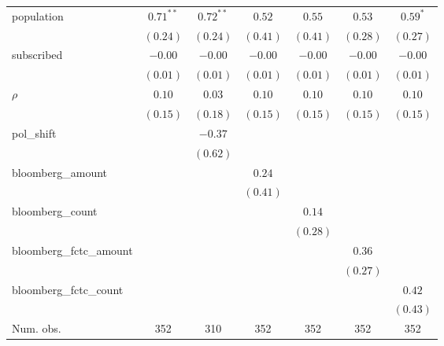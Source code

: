 \begin{table}[!h]
\begin{center}
\begin{tabular}{l c c c c c c }
population              & $0.71^{**}$  & $0.72^{**}$  & $0.52$       & $0.55$       & $0.53$       & $0.59^{*}$   \\
                        & $(0.24)$     & $(0.24)$     & $(0.41)$     & $(0.41)$     & $(0.28)$     & $(0.27)$     \\
subscribed              & $-0.00$      & $-0.00$      & $-0.00$      & $-0.00$      & $-0.00$      & $-0.00$      \\
                        & $(0.01)$     & $(0.01)$     & $(0.01)$     & $(0.01)$     & $(0.01)$     & $(0.01)$     \\
$\rho$                  & $0.10$       & $0.03$       & $0.10$       & $0.10$       & $0.10$       & $0.10$       \\
                        & $(0.15)$     & $(0.18)$     & $(0.15)$     & $(0.15)$     & $(0.15)$     & $(0.15)$     \\
pol\_shift              &              & $-0.37$      &              &              &              &              \\
                        &              & $(0.62)$     &              &              &              &              \\
bloomberg\_amount       &              &              & $0.24$       &              &              &              \\
                        &              &              & $(0.41)$     &              &              &              \\
bloomberg\_count        &              &              &              & $0.14$       &              &              \\
                        &              &              &              & $(0.28)$     &              &              \\
bloomberg\_fctc\_amount &              &              &              &              & $0.36$       &              \\
                        &              &              &              &              & $(0.27)$     &              \\
bloomberg\_fctc\_count  &              &              &              &              &              & $0.42$       \\
                        &              &              &              &              &              & $(0.43)$     \\
\midrule
Num. obs.               & 352          & 310          & 352          & 352          & 352          & 352          \\

\end{tabular}
\end{center}
\end{table}
